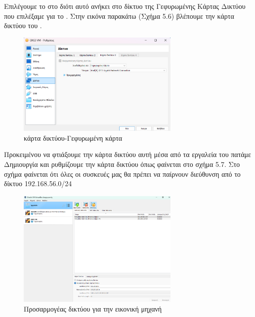 Επιλέγουμε το  στο  διότι αυτό ανήκει στο δίκτυο της Γεφυρωμένης Κάρτας Δικτύου που επιλέξαμε για το . Στην εικόνα παρακάτω (Σχήμα 5.6) βλέπουμε την κάρτα δικτύου του .

\FloatBarrier

\begin{figure}[htb]
	\centering
	\includegraphics[width=0.7\textwidth]{graphics/GNS3_network_adapter.png}
	\caption{ κάρτα δικτύου-Γεφυρωμένη κάρτα }
\end{figure}

\FloatBarrier

\noindent Προκειμένου να φτιάξουμε την κάρτα δικτύου αυτή μέσα από τα εργαλεία του  πατάμε Δημιουργία 
και ρυθμίζουμε την κάρτα δικτύου όπως φαίνεται στο σχήμα 5.7. Στο σχήμα φαίνεται ότι όλες οι συσκευές μας θα πρέπει να παίρνουν  διεύθυνση από το δίκτυο 192.168.56.0/24


\FloatBarrier

\begin{figure}[htb]
	\centering
	\includegraphics[width=0.7\textwidth]{graphics/GNS3_Network.png}
	\caption{Προσαρμογέας δικτύου για την εικονική μηχανή }
\end{figure}


